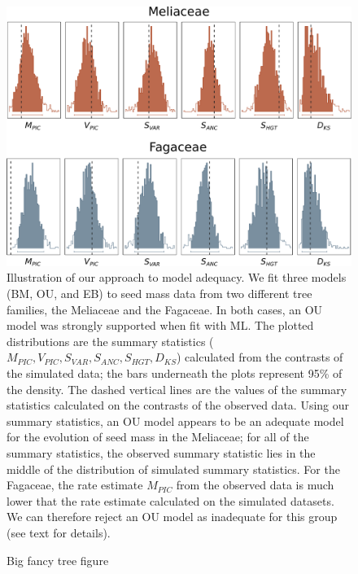 \documentclass[a4paper,12pt]{article}
\begin{document}
\begin{figure}[p]
  \centering
  \includegraphics[scale=0.5]{figs/two-clade-example}
  \caption{Illustration of our approach to model adequacy. We fit three models (BM, OU, and EB) to seed mass data from two different tree families, the Meliaceae and the Fagaceae. In both cases, an OU model was strongly supported when fit with ML. The plotted distributions are the summary statistics ($M_{PIC}, V_{PIC}, S_{VAR}, S_{ANC}, S_{HGT}, D_{KS}$) calculated from the contrasts of the simulated data; the bars underneath the plots represent 95\% of the density. The dashed vertical lines are the values of the summary statistics calculated on the contrasts of the observed data. Using our summary statistics, an OU model appears to be an adequate model for the evolution of seed mass in the Meliaceae; for all of the summary statistics, the observed summary statistic lies in the middle of the distribution of simulated summary statistics. For the Fagaceae, the rate estimate $M_{PIC}$ from the observed data is much lower that the rate estimate calculated on the simulated datasets. We can therefore reject an OU model as inadequate for this group (see text for details).}
  \label{fig:two-clades}
\end{figure}

\begin{figure}[p]
  \centering
  \caption{Big fancy tree figure}
  \label{fig:angio-phylogeny}
\end{figure}
\end{document}
